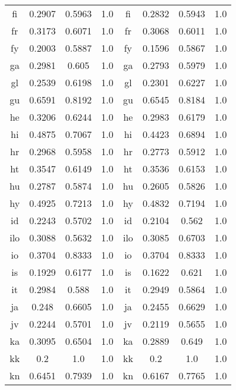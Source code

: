 \begin{figure}[h]
\begin{tabular}{cccc|cccc}
fi&0.2907&0.5963&1.0&	fi&0.2832&0.5943&1.0\\
fr&0.3173&0.6071&1.0&	fr&0.3068&0.6011&1.0\\
fy&0.2003&0.5887&1.0&	fy&0.1596&0.5867&1.0\\
ga&0.2981&0.605&1.0&	ga&0.2793&0.5979&1.0\\
gl&0.2539&0.6198&1.0&	gl&0.2301&0.6227&1.0\\
gu&0.6591&0.8192&1.0&	gu&0.6545&0.8184&1.0\\
he&0.3206&0.6244&1.0&	he&0.2983&0.6179&1.0\\
hi&0.4875&0.7067&1.0&	hi&0.4423&0.6894&1.0\\
hr&0.2968&0.5958&1.0&	hr&0.2773&0.5912&1.0\\
ht&0.3547&0.6149&1.0&	ht&0.3536&0.6153&1.0\\
hu&0.2787&0.5874&1.0&	hu&0.2605&0.5826&1.0\\
hy&0.4925&0.7213&1.0&	hy&0.4832&0.7194&1.0\\
id&0.2243&0.5702&1.0&	id&0.2104&0.562&1.0\\
ilo&0.3088&0.5632&1.0&	ilo&0.3085&0.6703&1.0\\
io&0.3704&0.8333&1.0&	io&0.3704&0.8333&1.0\\
is&0.1929&0.6177&1.0&	is&0.1622&0.621&1.0\\
it&0.2984&0.588&1.0&	it&0.2949&0.5864&1.0\\
ja&0.248&0.6605&1.0&	ja&0.2455&0.6629&1.0\\
jv&0.2244&0.5701&1.0&	jv&0.2119&0.5655&1.0\\
ka&0.3095&0.6504&1.0&	ka&0.2889&0.649&1.0\\
kk&0.2&1.0&1.0&	kk&0.2&1.0&1.0\\
kn&0.6451&0.7939&1.0&	kn&0.6167&0.7765&1.0\\
\end{tabular}
\end{figure}
\clearpage

